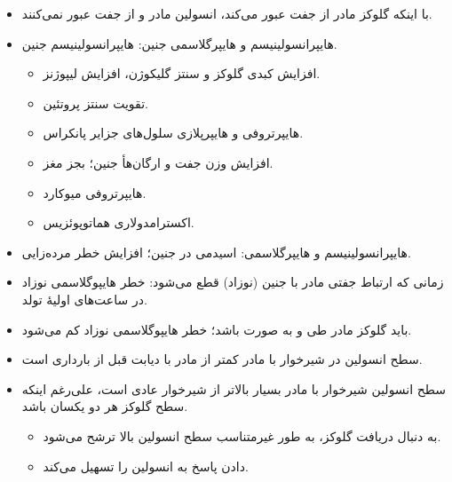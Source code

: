 \documentclass[12pt,a4paper]{article}
\begin{document}
\clearpage
{}
\begin{itemize}
\item با اینکه گلوکز مادر از جفت عبور می‌کند، انسولین مادر و  از جفت عبور نمی‌کنند.
\item هایپرانسولینیسم و هایپرگلاسمی جنین: هایپرانسولینیسم جنین.
  \begin{itemize}
  \item افزایش  کبدی گلوکز و سنتز گلیکوژن، افزایش لیپوژنز.
  \item تقویت سنتز پروتئین.
  \item هایپرتروفی و هایپرپلازی سلول‌های جزایر پانکراس.
  \item افزایش وزن جفت و ارگان‌هأ جنین؛ بجز مغز.
  \item هایپرتروفی میوکارد.
  \item \IDMmath{\uparrow} اکسترامدولاری هماتوپوئزیس.
  \end{itemize}
\item هایپرانسولینیسم و هایپرگلاسمی: اسیدمی در جنین؛ افزایش خطر مرده‌زایی.
\item زمانی که ارتباط جفتی مادر با جنین (نوزاد) قطع می‌شود: خطر هایپوگلاسمی نوزاد در ساعت‌های اولیهٔ تولد.
\item باید گلوکز مادر طی  و  به صورت  باشد؛ خطر هایپوگلاسمی نوزاد کم می‌شود.
\item سطح انسولین در شیرخوار با مادر  کمتر از مادر با دیابت قبل از بارداری است.
\item سطح انسولین  شیرخوار با مادر  بسیار بالاتر از شیرخوار عادی است، علی‌رغم اینکه سطح گلوکز هر دو یکسان باشد.
  \begin{itemize}
  \item به دنبال دریافت گلوکز، به طور غیرمتناسب سطح انسولین بالا ترشح می‌شود.
  \item دادن  پاسخ به انسولین را تسهیل می‌کند.
  \end{itemize}
\end{itemize}
\end{document}
